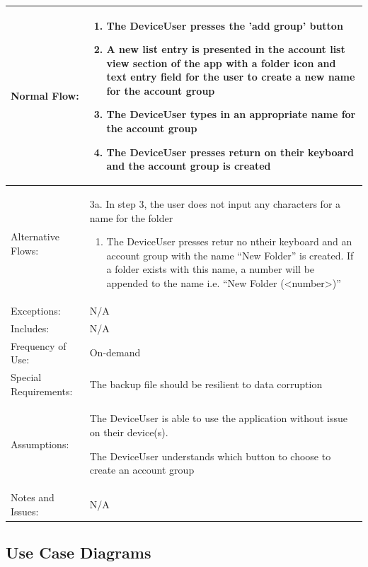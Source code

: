 \documentclass[stu]{apa7}
\newcommand{\nextitem}{\par\hspace*{\labelsep}\textbullet\hspace*{\labelsep}}
\newcommand{\nextitemblank}{\par\hspace*{\labelsep}\hspace*{\labelsep}}
\begin{document}
{{\begin{xltabular}{\textwidth}{|l|X|}
  Normal Flow: &
    \begin{enumerate}
            \item The DeviceUser presses the 'add group' button
            \item A new list entry is presented in the account list view section of the app with a folder icon and text entry field for the user to create a new name for the account group
            \item The DeviceUser types in an appropriate name for the account group
            \item The DeviceUser presses return on their keyboard and the account group is created
    \end{enumerate} \\ \hline

  Alternative Flows: &
                       \nextitemblank 3a. In step 3, the user does not input any characters for a name for the folder
                       \begin{enumerate}
                               \item The DeviceUser presses retur no ntheir keyboard and an account group with the name ``New Folder'' is created. If a folder exists with this name, a number will be appended to the name i.e. ``New Folder (<number>)''
                       \end{enumerate}
              \\ \hline

  Exceptions: &
                N/A
              \\ \hline
  Includes: & N/A \\ \hline

  Frequency of Use: & On-demand \\ \hline

  Special Requirements: & \nextitem The backup file should be resilient to data corruption \\ \hline

  Assumptions: & \nextitem The DeviceUser is able to use the application without issue on their device(s). \nextitem The DeviceUser understands which button to choose to create an account group \\ \hline

  Notes and Issues: & N/A \\ \hline

\end{xltabular}

\subsection{Use Case Diagrams}

}}
\end{document}
